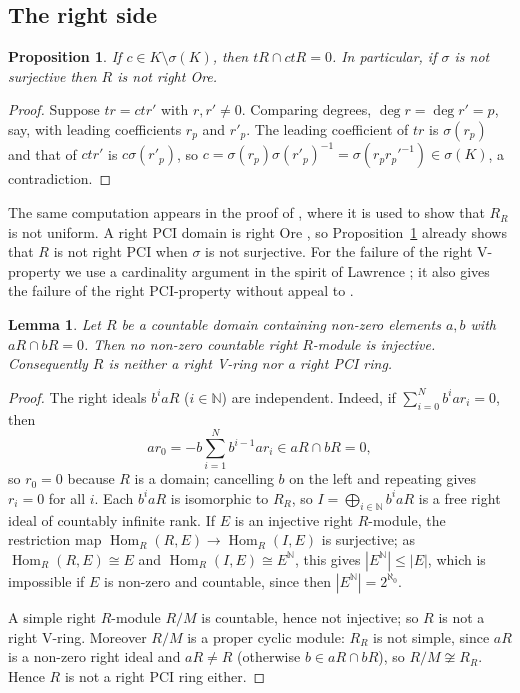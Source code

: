 \documentclass[11pt]{amsart}
\theoremstyle{plain}
\newtheorem{proposition}[theorem]{Proposition}
\newtheorem{lemma}[theorem]{Lemma}
\theoremstyle{definition}
\theoremstyle{remark}
\newcommand{\N}{\mathbb N}
\newcommand{\Hom}{\operatorname{Hom}}
\begin{document}
\subsection{The right side}

\begin{proposition}\label{prop:notore}
If $c\in K\setminus\sigma(K)$, then $tR\cap ctR=0$. In particular, if $\sigma$ is not surjective then $R$ is not right Ore.
\end{proposition}

\begin{proof}
Suppose $tr=ctr'$ with $r,r'\ne0$. Comparing degrees, $\deg r=\deg r'=p$, say, with leading coefficients $r_p$ and $r'_p$. The leading coefficient of $tr$ is $\sigma(r_p)$ and that of $ctr'$ is $c\sigma(r'_p)$, so $c=\sigma(r_p)\sigma(r'_p)^{-1}=\sigma(r_pr_p'^{-1})\in\sigma(K)$, a contradiction.
\end{proof}

The same computation appears in the proof of \cite[Proposition~6.1]{JLL09}, where it is used to show that $R_R$ is not uniform. A right PCI domain is right Ore \cite[6.17]{CF75}, so Proposition~\ref{prop:notore} already shows that $R$ is not right PCI when $\sigma$ is not surjective. For the failure of the right V-property we use a cardinality argument in the spirit of Lawrence \cite[Theorem~4]{Law77}; it also gives the failure of the right PCI-property without appeal to \cite{CF75}.

\begin{lemma}\label{lem:countable}
Let $R$ be a countable domain containing non-zero elements $a,b$ with $aR\cap bR=0$. Then no non-zero countable right $R$-module is injective. Consequently $R$ is neither a right V-ring nor a right PCI ring.
\end{lemma}

\begin{proof}
The right ideals $b^iaR$ ($i\in\N$) are independent. Indeed, if $\sum_{i=0}^Nb^iar_i=0$, then
\[
ar_0=-b\sum_{i=1}^Nb^{i-1}ar_i\in aR\cap bR=0,
\]
so $r_0=0$ because $R$ is a domain; cancelling $b$ on the left and repeating gives $r_i=0$ for all $i$. Each $b^iaR$ is isomorphic to $R_R$, so $I=\bigoplus_{i\in\N}b^iaR$ is a free right ideal of countably infinite rank. If $E$ is an injective right $R$-module, the restriction map $\Hom_R(R,E)\to\Hom_R(I,E)$ is surjective; as $\Hom_R(R,E)\cong E$ and $\Hom_R(I,E)\cong E^{\N}$, this gives $|E^{\N}|\le|E|$, which is impossible if $E$ is non-zero and countable, since then $|E^{\N}|=2^{\aleph_0}$.

A simple right $R$-module $R/M$ is countable, hence not injective; so $R$ is not a right V-ring. Moreover $R/M$ is a proper cyclic module: $R_R$ is not simple, since $aR$ is a non-zero right ideal and $aR\ne R$ (otherwise $b\in aR\cap bR$), so $R/M\not\cong R_R$. Hence $R$ is not a right PCI ring either.
\end{proof}
\end{document}
